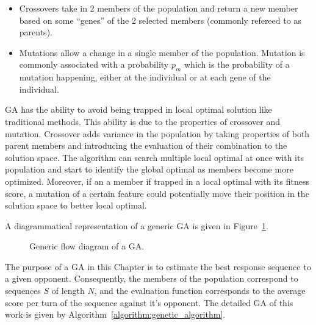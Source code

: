 \begin{itemize}
    \item Crossovers take in 2 members of the population and return a new member
    based on some ``genes'' of the 2 selected members (commonly refereed to as parents).
    \item Mutations allow a change in a single member of the population. Mutation
    is commonly associated with a probability \(p_m\) which is the probability
    of a mutation happening, either at the individual or at each gene of the
    individual.
\end{itemize}

GA has the ability to avoid being trapped in local optimal solution like
traditional methods. This ability is due to the properties of crossover and
mutation. Crossover adds variance in the population by taking properties of both
parent members and introducing the evaluation of their combination to the
solution space. The algorithm can search multiple local optimal at once with its
population and start to identify the global optimal as members become more
optimized. Moreover, if an a member if trapped in a local optimal with its
fitness score, a mutation of a certain feature could potentially move their
position in the solution space to better local optimal.

A diagrammatical representation of a generic GA is given in Figure~\ref{fig:ga_flow_diagram}.

\begin{figure}[!htbp]
    \centering
    
    \caption{Generic flow diagram of a GA.}\label{fig:ga_flow_diagram}
\end{figure}

The purpose of a GA in this Chapter is to estimate the best response sequence to
a given opponent. Consequently, the members of the population correspond to
sequences \(S\) of length \(N\), and the evaluation function corresponds to the
average score per turn of the sequence against it's opponent. The detailed GA of
this work is given by Algorithm~\ref{algorithm:genetic_algorithm}.

